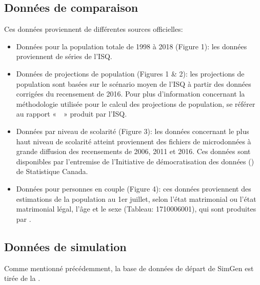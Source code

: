 \documentclass[letterpaper,10pt,french]{sphinxmanual}
\begin{document}
\subsection{Données de comparaison}
\label{\detokenize{resultats:donnees-de-comparaison}}
Ces données proviennent de différentes sources officielles:
\begin{itemize}
\item {} 
Données pour la population totale de 1998 à 2018 (Figure 1): les données proviennent de séries de l’ISQ.

\item {} 
Données de projections de population (Figures 1 \& 2): les projections de population sont basées sur le scénario moyen de l’ISQ à partir des données corrigées du recensement de 2016. Pour plus d’information concernant la méthodologie utilisée pour le calcul des projections de population, se référer au rapport «  » produit par l’ISQ.

\item {} 
Données par niveau de scolarité (Figure 3): les données concernant le plus haut niveau de scolarité atteint proviennent des fichiers de microdonnées à grande diffusion des recensements de 2006, 2011 et 2016. Ces données sont disponibles par l’entremise de l’Initiative de démocratisation des données () de Statistique Canada.

\item {} 
Données pour personnes en couple (Figure 4): ces données proviennent des estimations de la population au 1er juillet, selon l’état matrimonial ou l’état matrimonial légal, l’âge et le sexe (Tableau: 17\sphinxhyphen{}10\sphinxhyphen{}0060\sphinxhyphen{}01), qui sont produites par .

\end{itemize}


\subsection{Données de simulation}
\label{\detokenize{resultats:donnees-de-simulation}}
Comme mentionné précédemment, la base de données de départ de SimGen est tirée de la .
\end{document}
